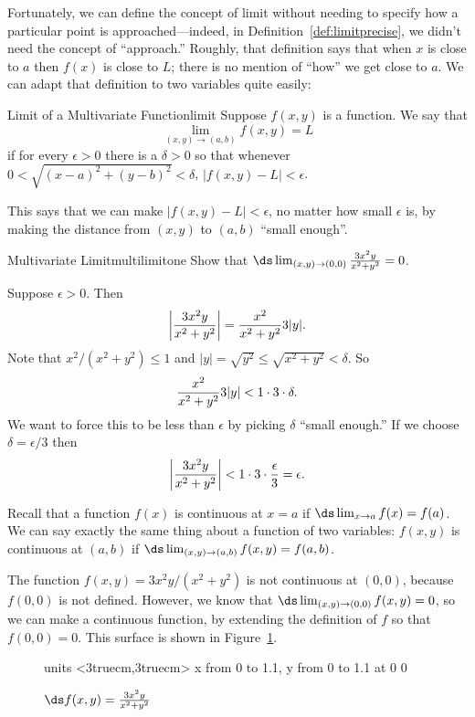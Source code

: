 Fortunately, we can define the concept of limit without needing to
specify how a particular point is approached---indeed, in 
Definition~\ref{def:limitprecise}, we didn't need the concept of
``approach.'' Roughly, that definition says that when $x$ is 
close to $a$ then $f(x)$ is close to $L$; there is no mention of
``how'' we get close to $a$. We can adapt that definition to two
variables quite easily:

\begin{definition}{Limit of a Multivariate Function}{limit}
Suppose $f(x,y)$ is a function. We say that 
$$\lim_{(x,y)\to
  (a,b)}f(x,y)=L$$
 if for every $\epsilon>0$ there is a $\delta > 0$ so that
  whenever $0 < \sqrt{(x-a)^2+(y-b)^2} < \delta$, $|f(x,y)-L|<\epsilon$.
\end{definition}

This says that we can make $|f(x,y)-L|<\epsilon$, no matter how small
$\epsilon$ is, by making the distance from $(x,y)$ to $(a,b)$ ``small
enough''. 

\begin{example}{Multivariate Limit}{multilimitone}
Show that $\ds \lim_{(x,y)\to(0,0)}{3x^2y\over
	x^2+y^2}=0$.
\end{example}
\begin{solution}
Suppose $\epsilon>0$. Then
$$\left|{3x^2y\over x^2+y^2}\right|={x^2\over x^2+y^2}3|y|.$$
Note that $x^2/(x^2+y^2)\le1$ and
$|y|=\sqrt{y^2}\le\sqrt{x^2+y^2}<\delta$. So
$${x^2\over x^2+y^2}3|y|<1\cdot 3\cdot \delta.$$
We want to force this to be less than $\epsilon$ by picking $\delta$
``small enough.'' If we choose $\delta=\epsilon/3$ then
$$\left|{3x^2y\over x^2+y^2}\right|< 1\cdot 3\cdot{\epsilon\over3}=
\epsilon.$$
\end{solution}

Recall that a function $f(x)$ is continuous at $x=a$ if 
$\ds\lim_{x\to a}f(x)=f(a)$. We can say exactly the same thing about
a function of two variables: $f(x,y)$ is continuous at $(a,b)$ if 
$\ds\lim_{(x,y)\to (a,b)}f(x,y)=f(a,b)$.

The function $f(x,y)=3x^2y/(x^2+y^2)$ is not continuous at $(0,0)$,
because $f(0,0)$ is not defined. However, we know that 
$\ds \lim_{(x,y)\to(0,0)}f(x,y)=0$, so we can make a continuous function,
by extending the definition of $f$ so that $f(0,0)=0$.
This surface is shown in Figure~\ref{fig:removable discontinuity}.

\begin{figure}[H]
\centerline{
\vbox{\beginpicture
\normalgraphs
\setcoordinatesystem units <3truecm,3truecm>
\setplotarea x from 0 to 1.1, y from 0 to 1.1
 at 0 0
\endpicture}}
\caption{$\ds f(x,y)={3x^2y\over x^2+y^2}$}
\label{fig:removable discontinuity}
\end{figure}

